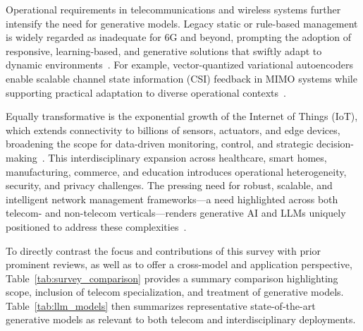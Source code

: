\documentclass[sigconf]{acmart}
\begin{document}
Operational requirements in telecommunications and wireless systems further intensify the need for generative models. Legacy static or rule-based management is widely regarded as inadequate for 6G and beyond, prompting the adoption of responsive, learning-based, and generative solutions that swiftly adapt to dynamic environments~\cite{ref13,ref21,ref26,ref46,ref49}. For example, vector-quantized variational autoencoders enable scalable channel state information (CSI) feedback in MIMO systems while supporting practical adaptation to diverse operational contexts~\cite{ref13}.

Equally transformative is the exponential growth of the Internet of Things (IoT), which extends connectivity to billions of sensors, actuators, and edge devices, broadening the scope for data-driven monitoring, control, and strategic decision-making~\cite{ref45}. This interdisciplinary expansion across healthcare, smart homes, manufacturing, commerce, and education introduces operational heterogeneity, security, and privacy challenges. The pressing need for robust, scalable, and intelligent network management frameworks---a need highlighted across both telecom- and non-telecom verticals---renders generative AI and LLMs uniquely positioned to address these complexities~\cite{ref45,ref26}.

To directly contrast the focus and contributions of this survey with prior prominent reviews, as well as to offer a cross-model and application perspective, Table~\ref{tab:survey_comparison} provides a summary comparison highlighting scope, inclusion of telecom specialization, and treatment of generative models. Table~\ref{tab:llm_models} then summarizes representative state-of-the-art generative models as relevant to both telecom and interdisciplinary deployments.
\end{document}
